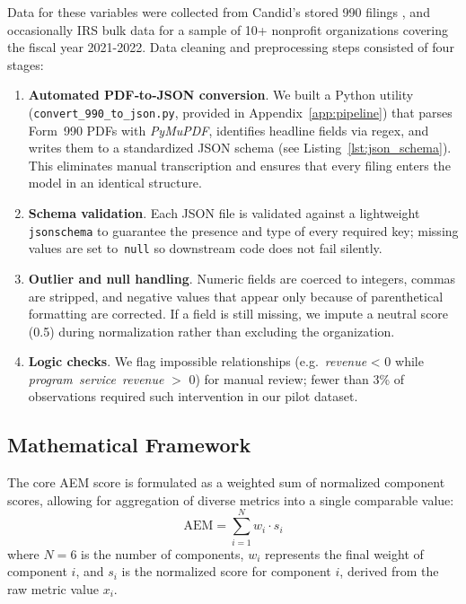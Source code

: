\documentclass[12pt]{article}
\begin{document}
Data for these variables were collected from Candid's stored 990 filings \cite{candid_990}, and occasionally IRS bulk data for a sample of 10+ nonprofit organizations covering the fiscal year 2021-2022. Data cleaning and preprocessing steps consisted of four stages:

\begin{enumerate}[label=\alph*)]
    \item \textbf{Automated PDF‐to‐JSON conversion}.  
    We built a Python utility (\texttt{convert\_990\_to\_json.py}, provided in Appendix~\ref{app:pipeline}) that parses Form~990 PDFs with \emph{PyMuPDF}, identifies headline fields via regex, and writes them to a standardized JSON schema (see Listing~\ref{lst:json_schema}).  This eliminates manual transcription and ensures that every filing enters the model in an identical structure.

    \item \textbf{Schema validation}.  
    Each JSON file is validated against a lightweight \texttt{jsonschema} to guarantee the presence and type of every required key; missing values are set to~\texttt{null} so downstream code does not fail silently.

    \item \textbf{Outlier and null handling}.  
    Numeric fields are coerced to integers, commas are stripped, and negative values that appear only because of parenthetical formatting are corrected.  If a field is still missing, we impute a neutral score (0.5) during normalization rather than excluding the organization.

    \item \textbf{Logic checks}.  
    We flag impossible relationships (e.g.\ \textit{revenue} < 0 while \textit{program~service~revenue} $>$ 0) for manual review; fewer than 3\% of observations required such intervention in our pilot dataset.
\end{enumerate}

\subsection{Mathematical Framework} %
The core AEM score is formulated as a weighted sum of normalized component scores, allowing for aggregation of diverse metrics into a single comparable value:
\begin{equation} \label{eq:aem_core}
    \text{AEM} = \sum_{i=1}^{N} w_i \cdot s_i
\end{equation}
where $N=6$ is the number of components, $w_i$ represents the final weight of component $i$, and $s_i$ is the normalized score for component $i$, derived from the raw metric value $x_i$.
\end{document}
